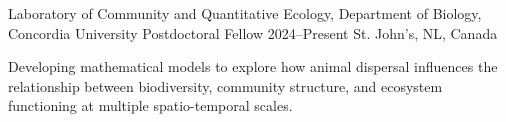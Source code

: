 

\begin{cventries}
  \cventry
    {\normalsize Laboratory of Community and Quantitative Ecology, Department of Biology, Concordia University} %
    {\normalsize Postdoctoral Fellow} %
    {\normalsize 2024--Present} %
    {\normalsize St. John's, NL, Canada} %
    {\normalsize
      \begin{cvitems} %
        \item {Developing mathematical models to explore how animal dispersal influences the relationship between biodiversity, community structure, and ecosystem functioning at multiple spatio-temporal scales.}
        \item {}
      \end{cvitems} 
    }
\end{cventries}

